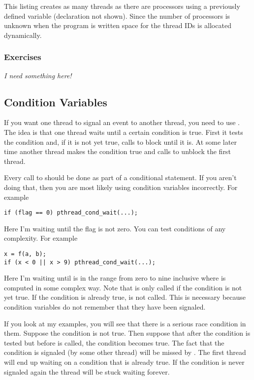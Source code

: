 This listing creates as many threads as there are processors using a previously defined variable
 (declaration not shown). Since the number of processors is unknown
when the program is written space for the thread IDs is allocated dynamically.

\subsubsection*{Exercises}

\textit{I need something here!}

\subsection{Condition Variables}
\label{subsec:condition-vars}

If you want one thread to signal an event to another thread, you need to use . The idea is that one thread waits until a certain condition is true. First it
tests the condition and, if it is not yet true, calls  to block
until it is. At some later time another thread makes the condition true and calls
 to unblock the first thread.

Every call to  should be done as part of a conditional statement.
If you aren't doing that, then you are most likely using condition variables incorrectly. For
example

\begin{lstlisting}
if (flag == 0) pthread_cond_wait(...);
\end{lstlisting}

Here I'm waiting until the flag is not zero. You can test conditions of any complexity. For
example

\begin{lstlisting}
x = f(a, b);
if (x < 0 || x > 9) pthread_cond_wait(...);
\end{lstlisting}

Here I'm waiting until  is in the range from zero to nine inclusive where 
is computed in some complex way. Note that  is only called if the
condition is not yet true. If the condition is already true,  is
not called. This is necessary because condition variables do not remember that they have been
signaled.

If you look at my examples, you will see that there is a serious race condition in them. Suppose
the condition is not true. Then suppose that after the condition is tested but before
 is called, the condition becomes true. The fact that the
condition is signaled (by some other thread) will be missed by .
The first thread will end up waiting on a condition that is already true. If the condition is
never signaled again the thread will be stuck waiting forever.

